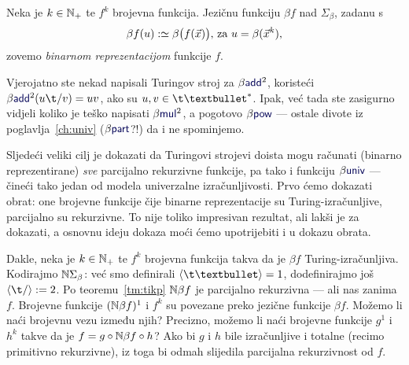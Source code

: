 \begin{definicija}[{name=[binarna reprezentacija brojevne funkcije]}]
Neka je $k\in{\mathbb N}_+$ te $f^k$ brojevna funkcija. Jezičnu funkciju $\beta f$ nad $\Sigma_\beta$, zadanu s
\begin{equation}\label{eq:betaf}
  \beta f(u):\simeq\beta\bigl(f(\vec x)\bigr)\text{, za } u=\beta(\vec x^k)\text,
\end{equation}
zovemo \emph{binarnom reprezentacijom} funkcije $f$.
\end{definicija}

Vjerojatno ste nekad napisali Turingov stroj za $\beta\f{add}^2$, koristeći $\beta\f{add}^2(u\t/v)=uv$, ako su $u,v\in\t\textbullet^*$. Ipak, već tada ste zasigurno vidjeli koliko je teško napisati $\beta\f{mul}^2$, a pogotovo $\beta\f{pow}$ --- ostale divote iz poglavlja~\ref{ch:univ} ($\beta\f{part}$?!) da i ne spominjemo.

Sljedeći veliki cilj je dokazati da Turingovi strojevi doista mogu računati (binarno reprezentirane) \emph{sve} parcijalno rekurzivne funkcije, pa tako i funkciju $\beta\f{univ}$ --- čineći tako jedan od modela univerzalne izračunljivosti. Prvo ćemo dokazati obrat: one brojevne funkcije čije binarne reprezentacije su Turing-izračunljive, parcijalno su rekurzivne. To nije toliko impresivan rezultat, ali lakši je za dokazati, a osnovnu ideju dokaza moći ćemo upotrijebiti i u dokazu obrata.


Dakle, neka je $k\in{\mathbb N}_+$ te $f^k$ brojevna funkcija takva da je $\beta f$ Turing-izračunljiva. Kodirajmo ${\mathbb N}\Sigma_\beta$: već smo definirali $\kr{\t\textbullet}=1$, dodefinirajmo još $\kr{\t/}:=2$.
Po teoremu~\ref{tm:tikp} ${\mathbb N}\beta f$ je parcijalno rekurzivna --- ali nas zanima $f$. Brojevne funkcije $({\mathbb N}\beta f)^1$ i $f^k$ su povezane preko jezične funkcije $\beta f$. Možemo li naći brojevnu vezu između njih? Precizno, možemo li naći brojevne funkcije $g^1$ i $h^k$ takve da je $f=g\circ{\mathbb N}\beta f\circ h$? Ako bi $g$ i $h$ bile izračunljive i totalne (recimo primitivno rekurzivne), iz toga bi odmah slijedila parcijalna rekurzivnost od $f$.%

